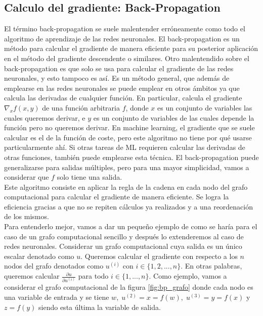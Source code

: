     
\subsection{Calculo del gradiente: Back-Propagation}

  El término back-propagation se suele malentender erróneamente como todo el algoritmo de aprendizaje de las redes neuronales. El back-propagation es un método para calcular el gradiente de manera eficiente para su posterior aplicación en el método del gradiente descendente o similares. Otro malentendido sobre el back-propagation es que solo se usa para calcular el gradiente de las redes neuronales, y esto tampoco es así. Es un método general, que además de emplearse en las redes neuronales se puede emplear en otros ámbitos ya que calcula las derivadas de cualquier función. En particular, calcula el gradiente $\nabla_{x}f(x,y)$ de una función arbitraria $f$, donde $x$ es un conjunto de variables las cuales queremos derivar, e $y$ es un conjunto de variables de las cuales depende la función pero no queremos derivar. En machine learning, el gradiente que se suele calcular es el de la función de coste, pero este algoritmo no tiene por qué usarse particularmente ahí. Si otras tareas de ML requieren calcular las derivadas de otras funciones, también puede emplearse esta técnica. El back-propagation puede generalizarse para salidas múltiples, pero para una mayor simplicidad, vamos a considerar que $f$ solo tiene una salida. \\ 
        

    Este algoritmo consiste en aplicar la regla de la cadena en cada nodo del grafo computacional para calcular el gradiente de manera eficiente. Se logra la eficiencia gracias a que no se repiten cálculos ya realizados y a una reordenación de los mismos. \\
        
    Para entenderlo mejor, vamos a dar un pequeño ejemplo de como se haría para el caso de un grafo computacional sencillo y después lo extenderemos al caso de redes neuronales. Considerar un grafo computacional cuya salida es un único escalar denotado como $u$. Queremos calcular el gradiente con respecto a los $n$ nodos del grafo denotados como $u^{(i)}$ con $i \in \{1,2,...,n\}$.  En otras palabras, queremos calcular $\frac{\partial u}{\partial u^{(i)}}$ para todo $i \in \{1,...,n\}$. Como ejemplo, vamos a considerar el grafo computacional de la figura \ref{fig:bp_grafo} donde cada nodo es una variable de entrada y se tiene $w, \; u^{(2)} = x = f(w), \; u^{(3)} = y = f(x)$ y $z = f(y)$ siendo esta última la variable de salida. \\
        
